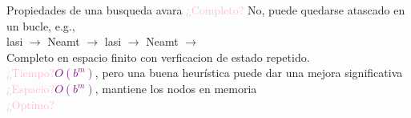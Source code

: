     \begin{frame}{Propiedades de una busqueda avara}
        \textcolor{Pink}{¿Completo?} No, puede quedarse atascado en un bucle, e.g.,\\
        lasi $\longrightarrow$ Neamt $\longrightarrow$ lasi $\longrightarrow$ Neamt $\longrightarrow$\\
        Completo en espacio finito con verficacion de estado repetido.\\
        \textcolor{Pink}{¿Tiempo?}\textcolor{Purple}{$O(b^m)$}, pero una buena heurística puede dar una mejora significativa\\
        \textcolor{Pink}{¿Espacio?}\textcolor{Purple}{$O(b^m)$}, mantiene los nodos en memoria\\
        \textcolor{Pink}{¿Optimo?}
    \end{frame}